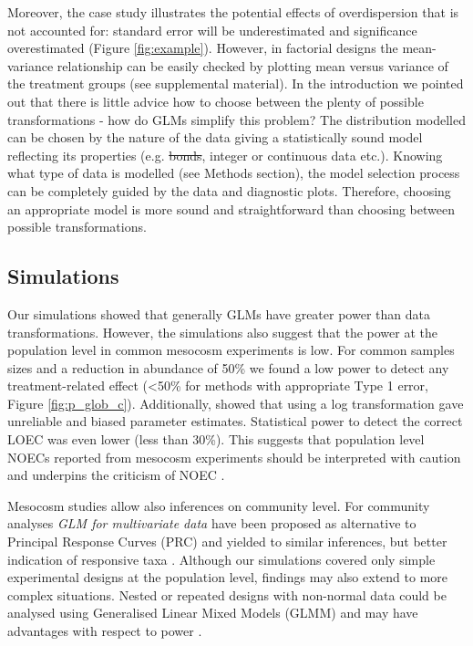 \documentclass[twocolumn, natbib]{svjour3}
\providecommand{\DIFadd}[1]{{\protect\color{blue}\uwave{#1}}} %
\providecommand{\DIFdel}[1]{{\protect\color{red}\sout{#1}}}                      %
\providecommand{\DIFaddbegin}{} %
\providecommand{\DIFaddend}{} %
\providecommand{\DIFdelbegin}{} %
\providecommand{\DIFdelend}{} %
\begin{document}
Moreover, the case study illustrates the potential effects of overdispersion that is not accounted for: standard error will be underestimated and significance overestimated (Figure \ref{fig:example}).
However, in factorial designs the mean-variance relationship can be easily checked by plotting mean versus variance of the treatment groups (see supplemental material).
In the introduction we pointed out that there is little advice how to choose between the plenty of possible transformations - how do GLMs simplify this problem?
The distribution modelled can be chosen by the nature of the data giving a statistically sound model reflecting its properties (e.g. \DIFdelbegin \DIFdel{bonds}\DIFdelend \DIFaddbegin \DIFadd{bounds}\DIFaddend , integer or continuous data etc.).
Knowing what type of data is modelled (see Methods section), the model selection process can be completely guided by the data and diagnostic plots. Therefore, choosing an appropriate model is more sound and straightforward than choosing between possible transformations.


\subsection{Simulations}
Our simulations showed that generally GLMs have greater power than data transformations.
However, the simulations also suggest that the power at the population level in common mesocosm experiments is low.
For common samples sizes and a reduction in abundance of 50\% we found a low power to detect any treatment-related effect (\textless 50\% for methods with appropriate Type 1 error, Figure \ref{fig:p_glob_c}).
Additionally, \citet{ohara_not_2010} showed that using a log transformation gave unreliable and biased parameter estimates.
Statistical power to detect the correct LOEC was even lower (less than 30\%).
This suggests that population level NOECs reported from mesocosm experiments should be interpreted with caution and underpins the criticism of NOEC \citep{laskowski_good_1995,landis_well_2011}.

Mesocosm studies allow also inferences on community level. 
For community analyses \emph{GLM for multivariate data} have been proposed as alternative to Principal Response Curves (PRC) and yielded to similar inferences, but better indication of responsive taxa \citep{warton_distance-based_2012,szocs_analysing_2015}. 
Although our simulations covered only simple experimental designs at the population level, findings may also extend to more complex situations. 
Nested or repeated designs with non-normal data could be analysed using Generalised Linear Mixed Models (GLMM) and may have advantages with respect to power \citep{stroup_rethinking_2014}.
\end{document}
